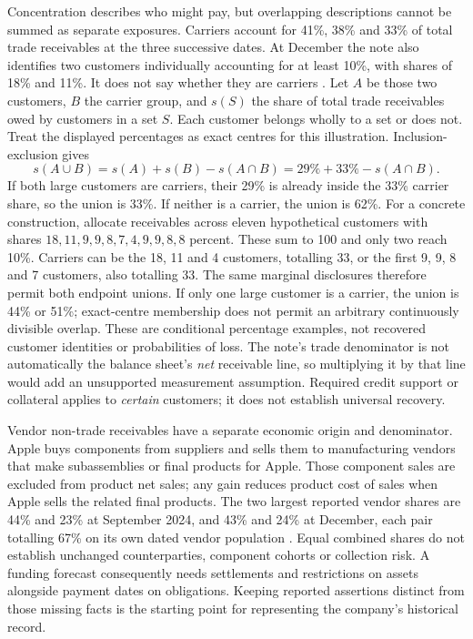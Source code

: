 Concentration describes who might pay, but overlapping descriptions cannot be
summed as separate exposures. Carriers account for 41\%, 38\% and 33\% of
total trade receivables at the three successive dates. At December the note
also identifies two customers individually accounting for at least 10\%, with
shares of 18\% and 11\%. It does not say whether they are carriers
\citep[Note 4, printed p.~38]{apple2024}
\citep[Note 4, printed p.~9]{apple2025q1}. Let $A$ be those two customers,
$B$ the carrier group, and $s(S)$ the share of total trade receivables owed
by customers in a set $S$. Each customer belongs wholly to a set or does not.
Treat the displayed percentages as exact centres for this illustration.
Inclusion-exclusion gives
\[
 s(A\cup B)=s(A)+s(B)-s(A\cap B)
          =29\%+33\%-s(A\cap B).
\]
If both large customers are carriers, their 29\% is already inside the 33\%
carrier share, so the union is 33\%. If neither is a carrier, the union is
62\%. For a concrete construction, allocate receivables across eleven
hypothetical customers with shares
$18,11,9,9,8,7,4,9,9,8,8$ percent. These sum to 100 and only two reach 10\%.
Carriers can be the 18, 11 and 4 customers, totalling 33, or the first
9, 9, 8 and 7 customers, also totalling 33. The same marginal disclosures
therefore permit both endpoint unions. If only one large customer is a carrier,
the union is 44\% or 51\%; exact-centre membership does not permit an
arbitrary continuously divisible overlap. These are conditional percentage
examples, not recovered customer identities or probabilities of loss. The
note's trade denominator is not automatically the balance sheet's \emph{net}
receivable line, so multiplying it by that line would add an unsupported
measurement assumption. Required credit support or collateral applies to
\emph{certain} customers; it does not establish universal recovery.

Vendor non-trade receivables have a separate economic origin and denominator.
Apple buys components from suppliers and sells them to manufacturing vendors
that make subassemblies or final products for Apple. Those component sales
are excluded from product net sales; any gain reduces product cost of sales
when Apple sells the related final products. The two largest reported vendor
shares are 44\% and 23\% at September 2024, and 43\% and 24\% at December,
each pair totalling 67\% on its own dated vendor population
\citep[annual and interim Note 4]{apple2024,apple2025q1}. Equal combined shares
do not establish unchanged counterparties, component cohorts or collection
risk. A funding forecast consequently needs settlements and restrictions on
assets alongside payment dates on obligations. Keeping reported assertions
distinct from those missing facts is the starting point for representing
the company's historical record.
